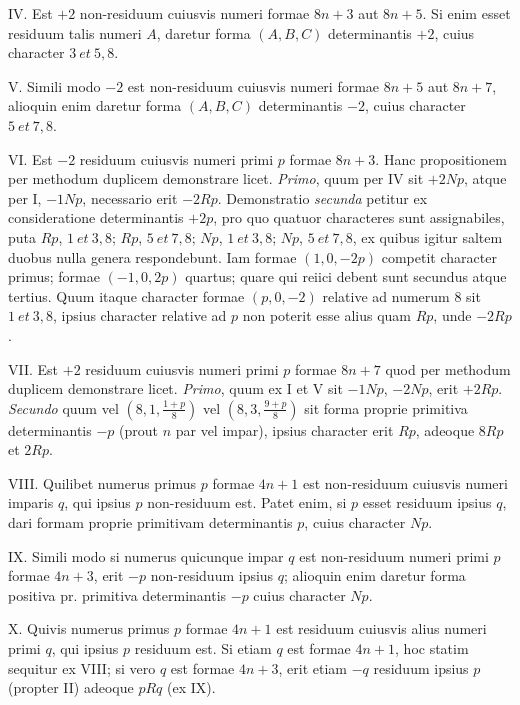 IV. Est $+2$ non-residuum cuiusvis numeri formae $8n+3$ aut $8n+5$.
Si enim esset residuum talis numeri $A$, daretur forma $(A,B,C)$ determinantis
$+2$, cuius character $3\ \mathit{et}\ 5,8$.

V. Simili modo $-2$ est non-residuum cuiusvis numeri formae $8n+5$
aut $8n+7$, alioquin enim daretur forma $(A,B,C)$ determinantis $-2$, cuius
character $5\ \mathit{et}\ 7,8$.

VI. Est $-2$ residuum cuiusvis numeri primi $p$ formae $8n+3$. Hanc
propositionem per methodum duplicem demonstrare licet. \textit{Primo}, quum per IV
sit $+2Np$, atque per I, $-1Np$, necessario erit $-2Rp$. Demonstratio \textit{secunda}
petitur ex consideratione determinantis $+2p$, pro quo quatuor characteres
sunt assignabiles, puta $Rp$, $1\ \mathit{et}\ 3,8$; $Rp$, $5\ \mathit{et}\ 7,8$; $Np$, $1\ \mathit{et}\ 3,8$; $Np$, $5\ \mathit{et}\ 7,8$,
ex quibus igitur saltem duobus nulla genera respondebunt. Iam formae
$(1,0,-2p)$ competit character primus; formae $(-1,0,2p)$ quartus; quare qui
reiici debent sunt secundus atque tertius. Quum itaque character formae
$(p,0,-2)$ relative ad numerum $8$ sit $1\ \mathit{et}\ 3,8$, ipsius character relative ad $p$ non
poterit esse alius quam $Rp$, unde $-2Rp$.

VII. Est $+2$ residuum cuiusvis numeri primi $p$ formae $8n+7$ quod
per methodum duplicem demonstrare licet. \textit{Primo}, quum ex I et V sit $-1Np$,
$-2Np$, erit $+2Rp$. \textit{Secundo} quum vel $\left(8,\allowbreak 1,\allowbreak \frac{1+p}{8}\right)$ vel $\left(8,\allowbreak 3,\allowbreak \frac{9+p}{8}\right)$ sit forma
proprie primitiva determinantis $-p$ (prout $n$ par vel impar), ipsius character
erit $Rp$, adeoque $8Rp$ et $2Rp$.

VIII. Quilibet numerus primus $p$ formae $4n+1$ est non-residuum cuiusvis
numeri imparis $q$, qui ipsius $p$ non-residuum est. Patet enim, si $p$ esset
residuum ipsius $q$, dari formam proprie primitivam determinantis $p$, cuius character
$Np$.

IX. Simili modo si numerus quicunque impar $q$ est non-residuum numeri
primi $p$ formae $4n+3$, erit $-p$ non-residuum ipsius $q$; alioquin enim daretur
forma positiva pr. primitiva determinantis $-p$ cuius character $Np$.

X. Quivis numerus primus $p$ formae $4n+1$ est residuum cuiusvis alius
numeri primi $q$, qui ipsius $p$ residuum est. Si etiam $q$ est formae $4n+1$, hoc
statim sequitur ex VIII; si vero $q$ est formae $4n+3$, erit etiam $-q$ residuum
ipsius $p$ (propter II) adeoque $pRq$ (ex IX).

